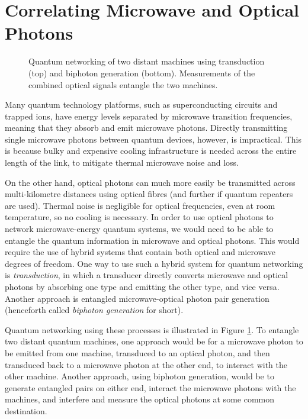 \section{Correlating Microwave and Optical Photons}
\begin{figure}[h]
\centering
{}
\caption{\label{fig:quantum_networking} Quantum networking of two distant machines using transduction (top) and biphoton generation (bottom). Measurements of the combined optical signals entangle the two machines.}
\end{figure}
Many quantum technology platforms, such as superconducting circuits and trapped ions, have energy levels separated by microwave transition frequencies, meaning that they absorb and emit microwave photons. Directly transmitting single microwave photons between quantum devices, however, is impractical. This is because bulky and expensive cooling infrastructure is needed across the entire length of the link, to mitigate thermal microwave noise and loss.

On the other hand, optical photons can much more easily be transmitted across multi-kilometre distances using optical fibres (and further if quantum repeaters\cite{briegel_1998} are used). Thermal noise is negligible for optical frequencies, even at room temperature, so no cooling is necessary. In order to use optical photons to network microwave-energy quantum systems, we would need to be able to entangle the quantum information in microwave and optical photons. This would require the use of hybrid systems that contain both optical and microwave degrees of freedom. One way to use such a hybrid system for quantum networking is \textit{transduction}, in which a transducer directly converts microwave and optical photons by absorbing one type and emitting the other type, and vice versa. Another approach is entangled microwave-optical photon pair generation (henceforth called \textit{biphoton generation} for short).

Quantum networking using these processes is illustrated in Figure \ref{fig:quantum_networking}. To entangle two distant quantum machines, one approach would be for a microwave photon to be emitted from one machine, transduced to an optical photon, and then transduced back to a microwave photon at the other end, to interact with the other machine. Another approach, using biphoton generation, would be to generate entangled pairs on either end, interact the microwave photons with the machines, and interfere and measure the optical photons at some common destination.

